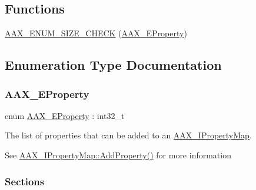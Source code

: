 \subsection*{Functions}
\begin{DoxyCompactItemize}
\item 
\mbox{\hyperlink{a00662_a73b910946acfa98628ab1f74e0c5ba97}{A\+A\+X\+\_\+\+E\+N\+U\+M\+\_\+\+S\+I\+Z\+E\+\_\+\+C\+H\+E\+CK}} (\mbox{\hyperlink{a00662_a13e384f22825afd3db6d68395b79ce0d}{A\+A\+X\+\_\+\+E\+Property}})
\end{DoxyCompactItemize}


\subsection{Enumeration Type Documentation}
\mbox{\label{a00662_a13e384f22825afd3db6d68395b79ce0d}} 
\subsubsection{\texorpdfstring{AAX\_EProperty}{AAX\_EProperty}}
{\footnotesize\ttfamily enum \mbox{\hyperlink{a00662_a13e384f22825afd3db6d68395b79ce0d}{A\+A\+X\+\_\+\+E\+Property}} \+: int32\+\_\+t}



The list of properties that can be added to an \mbox{\hyperlink{a01869}{A\+A\+X\+\_\+\+I\+Property\+Map}}. 

See \mbox{\hyperlink{a01869_a0997671afce9a2367662c764c1d055dd}{A\+A\+X\+\_\+\+I\+Property\+Map\+::\+Add\+Property()}} for more information

\subsubsection*{Sections }


